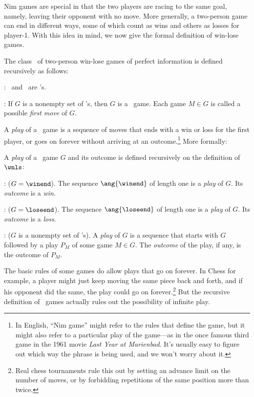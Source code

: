 \begin{definition}
Nim games are special in that the two players are racing to the same
goal, namely, leaving their opponent with no move.  More generally, a
two-person game can end in different ways, some of which count as wins
and others as losses for player-1.  With this idea in mind, we now
give the formal definition of win-lose games.

\begin{definition}
The class \wnls\ of two-person win-lose games of perfect information
is defined recursively as follows:

: \winend\ and \loseend\ are \wnls's.

: If $G$ is a nonempty set of \wnls's,
then $G$ is a \wnls\ game.  Each game $M \in G$ is called a possible
\emph{first move} of $G$.
\end{definition}

A \emph{play} of a \wnls\ game is a sequence of moves that ends with a
win or loss for the first player, or goes on forever without arriving
at an outcome.\footnote{In English, ``Nim game'' might refer to the
  rules that define the game, but it might also refer to a particular
  play of the game---as in the once famous third game in the 1961
  movie \emph{Last Year at Marienbad}.  It's usually easy to figure
  out which way the phrase is being used, and we won't worry about
  it.}
More formally:
\begin{definition*}%
A \emph{play} of a \wnls\ game $G$ and its outcome is defined
recursively on the definition of $\wnls$:

: ($G = \winend$).  The
sequence $\ang{\winend}$ of length one is a \emph{play} of $G$.  Its \emph{outcome}
is a \emph{win}.

: ($G = \loseend$).  The sequence $\ang{\loseend}$
of length one is a \emph{play} of $G$.  Its \emph{outcome} is a
\emph{loss}.

: ($G$ is a nonempty set of \wnls's).
A \emph{play} of $G$ is a sequence that starts with $G$ followed by a
play $P_M$ of some game $M \in G$.  The \emph{outcome} of the play, if
any, is the outcome of $P_M$.
\end{definition*}

The basic rules of some games do allow plays that go on forever.  In
Chess for example, a player might just keep moving the same piece back
and forth, and if his opponent did the same, the play could go on
forever.\footnote{Real chess tournaments rule this out by setting an
  advance limit on the number of moves, or by forbidding repetitions
  of the same position more than twice.}  But the recursive definition
of \wnls\ games actually rules out the possibility of infinite play.


\end{definition}
